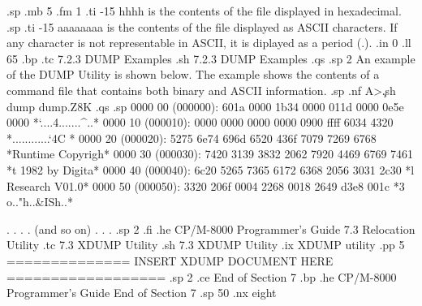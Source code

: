 .sp
.mb 5
.fm 1
.ti -15
hhhh           is the contents of the file displayed in hexadecimal.
.sp
.ti -15
aaaaaaaa       is the contents of the file displayed as ASCII 
characters.  If any character is not representable in
ASCII, it is diplayed as a period (.).
.in 0
.ll 65
.bp
.tc         7.2.3  DUMP Examples
.sh
7.2.3   DUMP Examples
.qs
.sp 2
An example of the DUMP Utility is shown below.  The example shows
the contents of a command file that contains both binary and ASCII
information. 
.sp
.nf
A>\c
.sh
dump dump.Z8K
.qs
.sp
0000 00 (000000):  601a 0000 1b34 0000 011d 0000 0e5e 0000 *`....4.......^..*
0000 10 (000010):  0000 0000 0000 0000 0900 ffff 6034 4320 *............`4C *
0000 20 (000020):  5275 6e74 696d 6520 436f 7079 7269 6768 *Runtime Copyrigh*
0000 30 (000030):  7420 3139 3832 2062 7920 4469 6769 7461 *t 1982 by Digita*
0000 40 (000040):  6c20 5265 7365 6172 6368 2056 3031 2c30 *l Research V01.0*
0000 50 (000050):  3320 206f 0004 2268 0018 2649 d3e8 001c *3  o.."h..&ISh..*

 . . . . (and so on) . . .
.sp 2
.fi
.he CP/M-8000 Programmer's Guide               7.3  Relocation Utility
.tc    7.3  XDUMP Utility
.sh
7.3  XDUMP Utility
.ix XDUMP utility
.pp 5
============== INSERT XDUMP DOCUMENT HERE ==================
.sp 2
.ce
End of Section 7
.bp
.he CP/M-8000 Programmer's Guide                      End of Section 7
.sp 50
.nx eight






